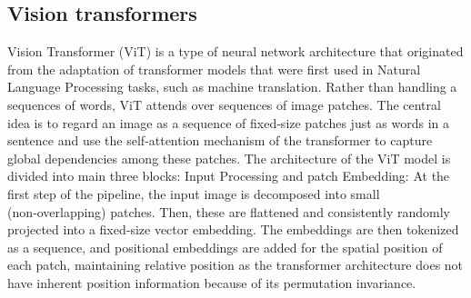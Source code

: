 \documentclass[final,5p,times,twocolumn,authoryear]{elsarticle}
\begin{document}
\subsection{Vision transformers}
Vision Transformer (ViT) is a type of neural network architecture that originated from the adaptation of transformer models that were first used in Natural Language Processing tasks, such as machine translation. Rather than handling a sequences of words, ViT attends over sequences of image patches. The central idea is to regard an image as a sequence of fixed‑size patches just as words in a sentence and use the self‑attention mechanism of the transformer to capture global dependencies among these patches. The architecture of the ViT model is divided into main three blocks:
Input Processing and patch Embedding: At the first step of the pipeline, the input image is decomposed into small (non‑overlapping) patches. Then, these are flattened and consistently randomly projected into a fixed‑size vector embedding. The embeddings are then tokenized as a sequence, and positional embeddings are added for the spatial position of each patch, maintaining relative position as the transformer architecture does not have inherent position information because of its permutation invariance.
\end{document}

